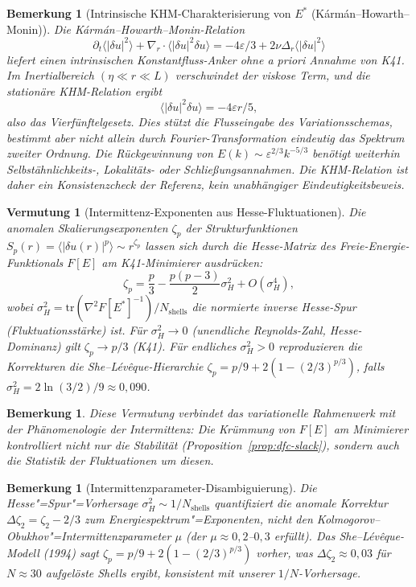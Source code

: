 \documentclass[12pt,a4paper]{article}
\theoremstyle{breakdef}
\theoremstyle{breakplain}
\newtheorem{conjecture}[definition]{Vermutung}
\theoremstyle{breakdef}
\newtheorem{remark}[definition]{Bemerkung}
\begin{document}
\begin{remark}[Intrinsische KHM-Charakterisierung von $E^*$ (Kármán--Howarth--Monin)]
\label{rem:khm-intrinsic}
Die Kármán--Howarth--Monin-Relation
\[
  \partial_t \langle |\delta u|^2 \rangle
  + \nabla_r \cdot \langle |\delta u|^2 \delta u \rangle
  = -4\varepsilon/3 + 2\nu \Delta_r \langle |\delta u|^2 \rangle
\]
liefert einen intrinsischen Konstantfluss-Anker ohne \emph{a priori}
Annahme von K41. Im Inertialbereich $(\eta \ll r \ll L)$ verschwindet
der viskose Term, und die stationäre KHM-Relation ergibt
\[
  \langle |\delta u|^2 \delta u \rangle = -4\varepsilon r / 5,
\]
also das Vierfünftelgesetz. Dies stützt die Flusseingabe des
Variationsschemas, bestimmt aber nicht allein durch Fourier-Transformation
eindeutig das Spektrum zweiter Ordnung. Die Rückgewinnung von
$E(k)\sim \varepsilon^{2/3}k^{-5/3}$ benötigt weiterhin
Selbstähnlichkeits-, Lokalitäts- oder Schließungsannahmen. Die
KHM-Relation ist daher ein Konsistenzcheck der Referenz, kein
unabhängiger Eindeutigkeitsbeweis.
\end{remark}

\begin{conjecture}[Intermittenz-Exponenten aus Hesse-Fluktuationen]
\label{conj:intermittency-hessian}
Die anomalen Skalierungsexponenten $\zeta_p$ der Strukturfunktionen $S_p(r) = \langle |\delta u(r)|^p \rangle \sim r^{\zeta_p}$ lassen sich durch die Hesse-Matrix des Freie-Energie-Funktionals $F[E]$ am K41-Minimierer ausdrücken:
\[
\zeta_p = \frac{p}{3} - \frac{p(p-3)}{2} \sigma_H^2 + O(\sigma_H^4),
\]
wobei $\sigma_H^2 = \mathrm{tr}(\nabla^2 F[E^*]^{-1}) / N_{\mathrm{shells}}$ die normierte inverse Hesse-Spur (\glqq Fluktuationsstärke\grqq{}) ist. Für $\sigma_H^2 \to 0$ (unendliche Reynolds-Zahl, Hesse-Dominanz) gilt $\zeta_p \to p/3$ (K41). Für endliches $\sigma_H^2 > 0$ reproduzieren die Korrekturen die She--Lévêque-Hierarchie $\zeta_p = p/9 + 2(1 - (2/3)^{p/3})$, falls $\sigma_H^2 = 2\ln(3/2)/9 \approx 0{,}090$.
\end{conjecture}

\begin{remark}
Diese Vermutung verbindet das variationelle Rahmenwerk mit der Phänomenologie der Intermittenz: Die Krümmung von $F[E]$ am Minimierer kontrolliert nicht nur die Stabilität (Proposition~\ref{prop:dfc-slack}), sondern auch die Statistik der Fluktuationen um diesen.
\end{remark}

\begin{remark}[Intermittenzparameter-Disambiguierung]\label{rem:mu-disambiguation}
Die Hesse"=Spur"=Vorhersage $\sigma_H^2 \sim 1/N_{\mathrm{shells}}$ quantifiziert die anomale Korrektur $\Delta\zeta_2 = \zeta_2 - 2/3$ zum Energiespektrum"=Exponenten, nicht den Kolmogorov--Obukhov"=Intermittenzparameter $\mu$ (der $\mu \approx 0{,}2$--$0{,}3$ erfüllt). Das She--Lévêque-Modell (1994) sagt $\zeta_p = p/9 + 2(1 - (2/3)^{p/3})$ vorher, was $\Delta\zeta_2 \approx 0{,}03$ für $N \approx 30$ aufgelöste Shells ergibt, konsistent mit unserer $1/N$-Vorhersage.
\end{remark}
\end{document}
